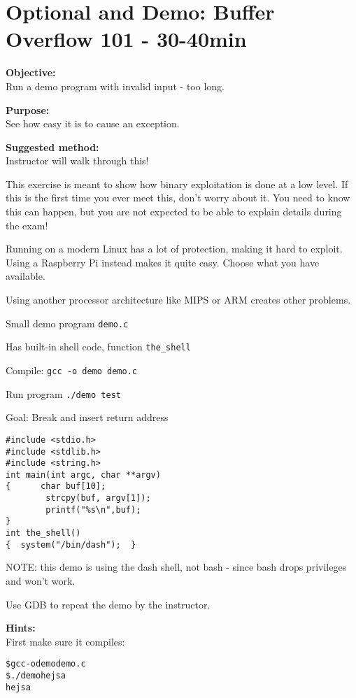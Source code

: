 \documentclass[a4paper,11pt,notitlepage]{report}
\begin{document}
\chapter{Optional and Demo: Buffer Overflow 101 - 30-40min}
\label{ex:bufferoverflow}


{\bf Objective:}\\
Run a demo program with invalid input - too long.

{\bf Purpose:}\\
See how easy it is to cause an exception.

{\bf Suggested method:}\\
Instructor will walk through this!

{\Large This exercise is meant to show how binary exploitation is done at a low level. If this is the first time you ever meet this, don't worry about it. You need to know this can happen, but you are not expected to be able to explain details during the exam!}

Running on a modern Linux has a lot of protection, making it hard to exploit. Using a Raspberry Pi instead makes it quite easy. Choose what you have available.

Using another processor architecture like MIPS or ARM creates other problems.

\begin{list2}
\item Small demo program \verb+demo.c+
\item Has built-in shell code, function \verb+the_shell+
\item Compile:
\verb+gcc -o demo demo.c+
\item Run program
\verb+./demo test+
\item Goal: Break and insert return address
\end{list2}

\begin{verbatim}
#include <stdio.h>
#include <stdlib.h>
#include <string.h>
int main(int argc, char **argv)
{      char buf[10];
        strcpy(buf, argv[1]);
        printf("%s\n",buf);
}
int the_shell()
{  system("/bin/dash");  }
\end{verbatim}

NOTE: this demo is using the dash shell, not bash - since bash drops privileges and won't work.

Use GDB to repeat the demo by the instructor.

{\bf Hints:}\\
First make sure it compiles:
\begin{alltt}
\$ gcc -o demo demo.c
\$ ./demo hejsa
hejsa
\end{alltt}
\end{document}
